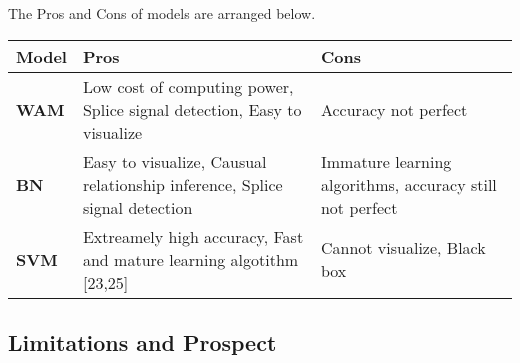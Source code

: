 \documentclass[11pt]{article}
\begin{document}
The Pros and Cons of models are arranged below.

\begin{longtable}[]{@{}lll@{}}
\toprule
\begin{minipage}[b]{0.35\columnwidth}\raggedright
Model\strut
\end{minipage} & \begin{minipage}[b]{0.28\columnwidth}\raggedright
Pros\strut
\end{minipage} & \begin{minipage}[b]{0.28\columnwidth}\raggedright
Cons\strut
\end{minipage}\tabularnewline
\midrule
\endhead
\begin{minipage}[t]{0.35\columnwidth}\raggedright
\textbf{WAM}\strut
\end{minipage} & \begin{minipage}[t]{0.28\columnwidth}\raggedright
Low cost of computing power, Splice signal detection, Easy to
visualize\strut
\end{minipage} & \begin{minipage}[t]{0.28\columnwidth}\raggedright
Accuracy not perfect\strut
\end{minipage}\tabularnewline
\begin{minipage}[t]{0.35\columnwidth}\raggedright
\textbf{BN}\strut
\end{minipage} & \begin{minipage}[t]{0.28\columnwidth}\raggedright
Easy to visualize, Causual relationship inference, Splice signal
detection\strut
\end{minipage} & \begin{minipage}[t]{0.28\columnwidth}\raggedright
Immature learning algorithms, accuracy still not perfect\strut
\end{minipage}\tabularnewline
\begin{minipage}[t]{0.35\columnwidth}\raggedright
\textbf{SVM}\strut
\end{minipage} & \begin{minipage}[t]{0.28\columnwidth}\raggedright
Extreamely high accuracy, Fast and mature learning algotithm
{[}23,25{]}\strut
\end{minipage} & \begin{minipage}[t]{0.28\columnwidth}\raggedright
Cannot visualize, Black box\strut
\end{minipage}\tabularnewline
\bottomrule
\end{longtable}

    \hypertarget{limitations-and-prospect}{%
\subsection{Limitations and Prospect}\label{limitations-and-prospect}}
\end{document}
